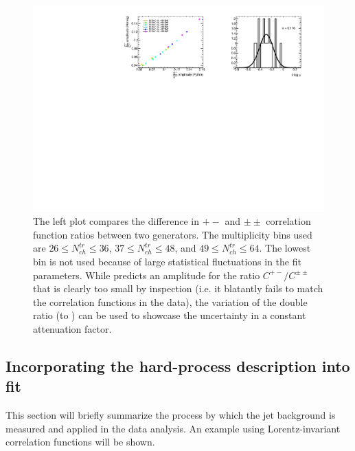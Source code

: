 \begin{figure}[t]
\begin{minipage}[t]{\textwidth}
\centering
\includegraphics{mu_pythia_herwig.pdf}
\end{minipage}
\caption{The left plot compares the difference in $+-$ and $\pm\pm$ correlation function ratios between two generators. The multiplicity bins used are $26 \leq N_{ch}^{tr} \leq 36$, $37 \leq N_{ch}^{tr} \leq 48$, and $49 \leq N_{ch}^{tr} \leq 64$. The lowest \kt bin is not used because of large statistical fluctuations in the fit parameters. While \Herwig predicts an amplitude for the ratio $C^{+-}/C^{\pm\pm}$ that is clearly too small by inspection (i.e. it blatantly fails to match the correlation functions in the data), the variation of the double ratio (\Herwig to \PYEight) can be used to showcase the uncertainty in a constant attenuation factor.}
\label{fig:delta_mu_pythia_herwig}
\end{figure}

\subsection{Incorporating the hard-process description into fit}

This section will briefly summarize the process by which the jet background is measured and applied in the data analysis.
An example using Lorentz-invariant correlation functions will be shown.

